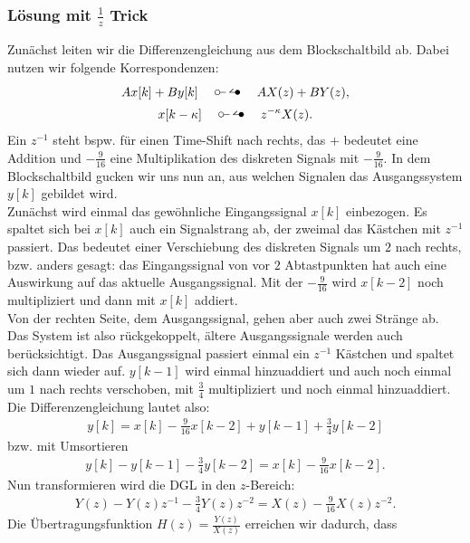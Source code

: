 \documentclass[11pt,a4paper,DIV=12]{scrartcl}
\begin{document}
\subsubsection*{Lösung mit $\frac{1}{z}$ Trick}
Zunächst leiten wir die Differenzengleichung aus dem Blockschaltbild ab. 
Dabei nutzen wir folgende Korrespondenzen:
%
%
%
\begin{gather}
	Ax[k]+By[k]\quad\ztransf\quad AX(z)+BY(z),\nonumber\\
	x[k-\kappa]\quad\ztransf\quad z^{-\kappa}X(z).\nonumber
\end{gather}
%
%
%
Ein $z^{-1}$ steht bspw. für einen Time-Shift nach rechts, das $+$ bedeutet
eine Addition und $-\frac{9}{16}$ eine Multiplikation des diskreten Signals mit
$-\frac{9}{16}$. 
%
In dem Blockschaltbild gucken wir uns nun an, aus welchen Signalen das 
Ausgangssystem $y[k]$ gebildet wird.\\
%
Zunächst wird einmal das gewöhnliche Eingangssignal $x[k]$ einbezogen. 
%
Es spaltet sich bei $x[k]$ auch ein Signalstrang ab, der zweimal das Kästchen 
mit $z^{-1}$ passiert. Das bedeutet einer Verschiebung des diskreten Signals um 
$2$ nach rechts, bzw. anders gesagt: das Eingangssignal von vor $2$ 
Abtastpunkten hat auch eine Auswirkung auf das aktuelle Ausgangssignal. 
%
Mit der $-\frac{9}{16}$ wird $x[k-2]$ noch multipliziert und dann mit $x[k]$ 
addiert.\\
%
Von der rechten Seite, dem Ausgangssignal, gehen aber auch zwei Stränge ab.
%
Das System ist also rückgekoppelt, ältere Ausgangssignale werden auch 
berücksichtigt. 
%
Das Ausgangssignal passiert einmal ein $z^{-1}$ Kästchen und spaltet sich dann
wieder auf.
%
$y[k-1]$ wird einmal hinzuaddiert und auch noch einmal um $1$ nach rechts
verschoben, mit $\frac{3}{4}$ multipliziert und noch einmal hinzuaddiert.
%
Die Differenzengleichung lautet also:
%
%
%
\begin{gather}
	y[k] = x[k] - \frac{9}{16} x[k-2] + y[k-1] + \frac{3}{4} y[k-2]
\end{gather}
%
%
%
bzw. mit Umsortieren
%
%
%
\begin{gather}
	y[k] - y[k-1] - \frac{3}{4} y[k-2] = x[k] - \frac{9}{16} x[k-2].
\end{gather}
%
%
%
Nun transformieren wird die DGL in den $z$-Bereich:
%
%
%
\begin{gather}
	Y(z) - Y(z) z^{-1} - \frac{3}{4} Y(z) z^{-2} = X(z) - \frac{9}{16} X(z) z^{-2}.
\end{gather}
%
%
%
Die Übertragungsfunktion $H(z)=\frac{Y(z)}{X(z)}$ erreichen wir dadurch, dass 
\end{document}
